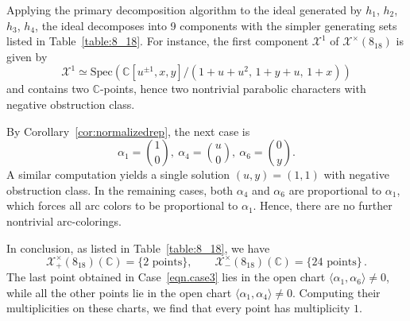 \documentclass[12pt,reqno]{amsart}
\newcommand{\BC}{\mathbb{C}}
\newcommand{\calX}{\mathcal{X}}
\newcommand{\Spec}{\mathrm{Spec}}
\theoremstyle{definition}
\begin{document}
	Applying the primary decomposition algorithm to the ideal generated by $h_1$, $h_2$, $h_3$, $h_4$, the ideal decomposes into 9 components with the simpler generating sets listed in Table~\ref{table:8_18}. For instance, the first component $\calX^1$ of $\calX^\times(8_{18})$ is given by
    $$ \calX^1 \simeq \Spec \left( \BC[u^{\pm1},x,y]/(1+u+u^2,\,1+y+u,\,1+x) \right)$$
	and contains two $\BC$-points, hence two nontrivial parabolic characters with negative obstruction class.
    
    By Corollary~\ref{cor:normalizedrep}, the next case is
	\begin{equation} \label{eqn.case3}
		\alpha_1=\binom{1}{0}, \
		\alpha_4=\binom{u}{0}, \
		\alpha_6=\binom{0}{y}.
	\end{equation}
	A similar computation yields a single solution $(u,y)=(1,1)$ with negative obstruction class. In the remaining cases, both $\alpha_4$ and $\alpha_6$ are proportional to $\alpha_1$, which forces all arc colors to be proportional to $\alpha_1$. Hence, there are no further nontrivial arc-colorings.

    In conclusion, as listed in Table~\ref{table:8_18}, we have
    $$\calX^\times_{+}(8_{18})(\BC) = \{ \text{2 points} \} ,\qquad \calX^\times_{-}(8_{18})(\BC)=\{ \text{24 points} \} \,.$$ 
    The last point obtained in Case~\eqref{eqn.case3} lies in the open chart $\langle \alpha_1,\alpha_6\rangle\neq 0$, while all the other points lie in the open chart $\langle \alpha_1,\alpha_4\rangle\neq 0$. Computing their multiplicities on these charts, we find that every point has multiplicity $1$.
\end{document}
